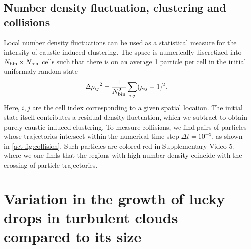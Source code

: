 \documentclass[../Rajarshi-thesis-draft.tex]{subfiles}
\begin{document}
\section{Number density fluctuation, clustering and collisions}
\label{act-denflu}
Local number density fluctuations can be used as a statistical measure for the intensity of caustic-induced clustering. The space is numerically discretized into $N_{\rm bin} \times N_{\rm bin}$ cells such that there is on an average 1 particle per cell in the initial uniformaly random state
\begin{equation}
    {\Delta \rho_{ij}}^{2} = \frac{1}{N_{\rm bin}^2}\sum_{i,j} (\rho_{ij} - 1)^{2}.
\end{equation}
Here, $i,j$ are the cell index corresponding to a given spatial location. The initial state itself contributes a residual density fluctuation, which we subtract to obtain purely caustic-induced clustering. 
To measure collisions, we find pairs of particles whose trajectories intersect within the numerical time step $\Delta t = 10^{-3}$, as shown in \ref{act-fig:collision}. Such particles are colored red in Supplementary Video 5; where we one finds that the regions with high number-density coincide with the crossing of particle trajectories.

\chapter{Variation in the growth of lucky drops in turbulent clouds compared to its size}

\end{document}
